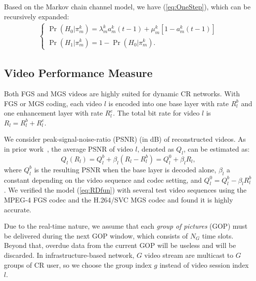 \documentclass[12pt,onecolumn,draftclsnofoot]{IEEEtran} %
\begin{document}
Based on the Markov chain channel model, we have (\ref{eq:OneStep}), which can be recursively expanded:
\begin{eqnarray} \label{eq:OneStep}
  \left\{ \begin{array}{l}
    \Pr(H_0|\pi_m^k) = \lambda_m^k a_m^k(t-1) + \mu_m^k \left[ 1-a_m^k(t-1) \right] \\
    \Pr(H_1|\pi_m^k) = 1-\Pr(H_0|\pi_m^k).  
  \end{array} \right. 
\end{eqnarray}  

\subsection{Video Performance Measure}\label{sec:VideoRate}

Both FGS and MGS videos are highly suited for dynamic CR networks.  With FGS or MGS coding, each video $l$ is encoded into one base layer with rate $R_l^b$ and one enhancement layer with rate $R_l^e$.  The total bit rate for video $l$ is
  $R_l=R_l^b+R_l^e$.

We consider peak-signal-noise-ratio (PSNR) (in dB) of reconstructed videos.  As in prior work~\cite{Schaar03}, the average PSNR of video $l$, denoted as $Q_l$, can be estimated as:
\begin{equation}\label{eq:RDfun}
  Q_l(R_l) = Q_l^b + \beta_l(R_l - R_l^b) = Q_l^0 + \beta_l R_l,
\end{equation}
where 
$Q_l^b$ is the resulting PSNR when the base layer is decoded alone, $\beta_l$ a constant depending on the video sequence and codec setting, and $Q_l^0 = Q_l^b - \beta_l R_l^b$.  We verified the model (\ref{eq:RDfun}) with several test video sequences using the MPEG-4 FGS codec and the H.264/SVC MGS codec and found it is highly accurate. 

Due to the real-time nature, we assume that each {\em group of pictures} (GOP) must be delivered during the next GOP window, which consists of $N_G$ time slots.  Beyond that, overdue data from the current GOP will be useless and will be discarded. In infrastructure-based network, $G$ video stream are multicast to $G$ groups of CR user, so we choose the group index $g$ instead of video session index $l$.  
\end{document}
